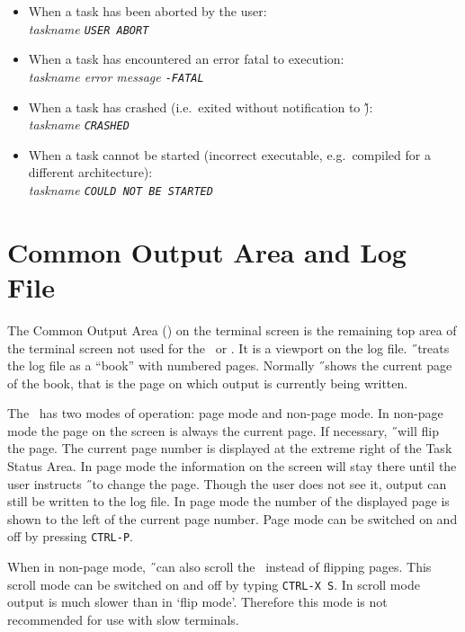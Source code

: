 \begin{itemize}
\item When a task has been aborted by the user:\\
{\it taskname \hspace{5mm} \tt USER ABORT}
\item When a task has encountered an error fatal to execution:\\
{\it taskname \hspace{5mm} error message \tt -FATAL}
\item When a task has crashed (i.e.\ exited without notification to \H):\\
{\it taskname \hspace{5mm} \tt CRASHED}
\item When a task cannot be started (incorrect executable,
e.g.\ compiled for a different architecture):\\
{\it taskname \hspace{5mm} \tt COULD NOT BE STARTED}
\end{itemize}

\section{Common Output Area and Log File}
The Common Output Area (\COA ) on the terminal screen is the remaining top area
of the terminal screen not used for the \UCA\ or \TSA .
It is a viewport on the log file.
\H\ treats the log file as a ``book'' with numbered pages.
Normally \H\ shows the current page of the book, that is the page on
which output is currently being written.

The \COA\ has two modes of operation: page mode and non-page mode.
In non-page mode the page on the screen is always the current page.
If necessary, \H\ will flip the page. The current page number is displayed at
the extreme right of the Task Status Area.
In page mode the information on the screen will stay there until the user
instructs \H\ to change the page.
Though the user does not see it, output can still be written to the log file.
In page mode the number of the displayed
page is shown to the left of the current page number.
Page mode can be switched on and off by pressing {\tt CTRL-P}.\label{ctrlp}

When in non-page mode, \H\ can also scroll the \COA\ instead of flipping
pages. This scroll mode can be switched on and off by typing \label{ctrlxs}
{\tt CTRL-X S}.
In scroll mode output is much slower than in `flip mode'. Therefore this
mode is not recommended for use with slow terminals.

